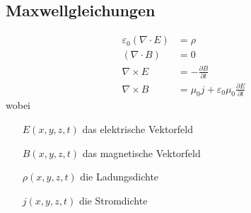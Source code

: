 \documentclass[11pt]{article}
\begin{document}
\subsection{Maxwellgleichungen}
\begin{equation*}
\begin{split}
	\varepsilon _0 (\nabla\cdot E) & = \rho \\
	(\nabla\cdot B) & = 0 \\
	\nabla\times E & = -\frac{\partial B}{\partial t} \\
	\nabla\times B & = \mu _0 j + \varepsilon _0 \mu _0 \frac{\partial E}{\partial t}	
\end{split}
\end{equation*}
wobei 
\begin{enumerate}
	\item [$E(x,y,z,t)$] das elektrische Vektorfeld
	\item [$B(x,y,z,t)$] das magnetische Vektorfeld
	\item [$\rho(x,y,z,t)$] die Ladungsdichte
	\item [$j(x,y,z,t)$] die Stromdichte
\end{enumerate}
\end{document}
